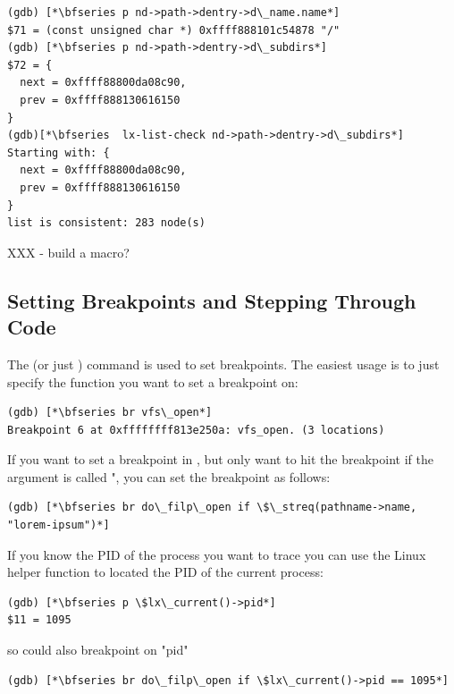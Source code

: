 \begin{lstlisting}
(gdb) [*\bfseries p nd->path->dentry->d\_name.name*]
$71 = (const unsigned char *) 0xffff888101c54878 "/"
(gdb) [*\bfseries p nd->path->dentry->d\_subdirs*]
$72 = {
  next = 0xffff88800da08c90,
  prev = 0xffff888130616150
}
(gdb)[*\bfseries  lx-list-check nd->path->dentry->d\_subdirs*]
Starting with: {
  next = 0xffff88800da08c90,
  prev = 0xffff888130616150
}
list is consistent: 283 node(s)
\end{lstlisting}

\noindent
XXX - build a macro?


\subsection{Setting Breakpoints and Stepping Through Code}

The  (or just ) command is used to set breakpoints. The easiest usage is to just specify the function you want to set a breakpoint on:

\begin{lstlisting}
(gdb) [*\bfseries br vfs\_open*]
Breakpoint 6 at 0xffffffff813e250a: vfs_open. (3 locations)
\end{lstlisting}

\noindent
If you want to set a breakpoint in , but only want to hit the breakpoint if the  argument is called ", you can set the breakpoint as follows:

\begin{lstlisting}
(gdb) [*\bfseries br do\_filp\_open if \$\_streq(pathname->name, "lorem-ipsum")*]
\end{lstlisting}

\noindent
If you know the PID of the process you want to trace you can use the Linux helper function to located the PID of the current process:

\begin{lstlisting}
(gdb) [*\bfseries p \$lx\_current()->pid*]
$11 = 1095
\end{lstlisting}

\noindent
so could also breakpoint on "pid"

\begin{lstlisting}
(gdb) [*\bfseries br do\_filp\_open if \$lx\_current()->pid == 1095*]
\end{lstlisting}

